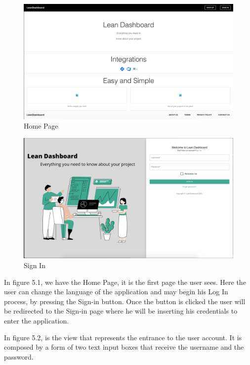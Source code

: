\documentclass[a4paper,twoside,10pt]{report}
\begin{document}
\begin{figure}[h!]
\center
    \includegraphics[width=\textwidth]{HomePage.png}
\caption{Home Page}
\end{figure}
\begin{figure}[h!]
\center
    \includegraphics[width=\textwidth]{SignIn.png}
\caption{Sign In}
\end{figure}

In figure 5.1, we have the Home Page, it is the first page the user sees. Here the user can change the language of the application and may begin his Log In process, by pressing the Sign-in button. Once the button is clicked the user will be redirected to the Sign-in page where he will be inserting his credentials to enter the application.


In figure 5.2, is the view that represents the entrance to the user account. It is composed by a form of two text input boxes that receive the username and the password.
\end{document}
